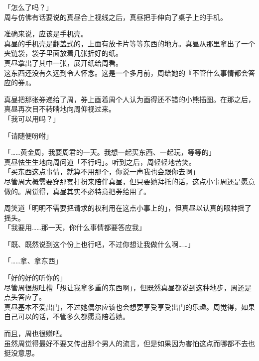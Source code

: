 「怎么了吗？」\\

周与仿佛有话要说的真昼合上视线之后，真昼把手伸向了桌子上的手机。

准确来说，应该是手机壳。\\

真昼的手机壳是翻盖式的，上面有放卡片等等东西的地方。真昼从那里拿出了一个夹链袋，袋子里面放着几张折好的纸。\\

真昼拿出了其中一张，展开纸给周看。\\

这东西还没有久远到令人怀念。这是一个多月前，周给她的『不管什么事情都会答应的券』。

真昼把那张券递给了周，券上画着周个人认为画得还不错的小熊插图。在那之后，真昼再次目不转睛地向周仰视过来。\\

「我可以用吗？」

「请随便吩咐」

「……黄金周，我要周君的一天。我想一起买东西、一起玩，等等的」\\

真昼怯生生地向周问道「不行吗」。听到之后，周轻轻地苦笑。\\

「买东西这点事情，就算不用那个，你说一声我也会跟你去啊」\\

尽管周大概需要穿那套打扮来陪伴真昼，但只要她拜托的话，这点小事周还是愿意做的。周觉得，真昼其实不必特意把券给用了。

周笑道「明明不需要把请求的权利用在这点小事上的」，但真昼以认真的眼神摇了摇头。\\

「我要用……那一天，你什么事情都要答应我」

「既、既然说到这个份上也行吧，不过你想让我做什么啊……」

「……拿、拿东西」

「好的好的听你的」\\

尽管周很想吐槽「想让我拿多重的东西啊」，但既然真昼都说到这种地步，周还是点头答应了。\\

真昼基本不爱出门，不过她偶尔应该也会想要享受享受出门的乐趣。周觉得，如果自己可以的话，不管多久都愿意陪着她。

而且，周也很赚吧。\\

虽然周觉得最好不要又传出那个男人的流言，但是如果因为害怕这点而哪都不去也挺没意思。\\

